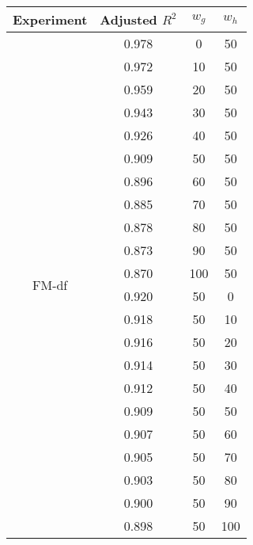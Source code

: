 \documentclass{article}
\begin{document}
\begin{table}[h]
  \centering
  \begin{tabular}{c c c c}
    \toprule
    Experiment                & Adjusted $R^2$ & $w_g$ & $w_h$ \\
    \midrule
    \multirow{22}{*}{FM-df} & 0.978 & 0 & 50 \\
                              & 0.972 & 10  & 50 \\
                              & 0.959 & 20  & 50 \\
                              & 0.943 & 30  & 50 \\
                              & 0.926 & 40  & 50 \\
                              & 0.909 & 50  & 50 \\
                              & 0.896 & 60  & 50 \\
                              & 0.885 & 70  & 50 \\
                              & 0.878 & 80  & 50 \\
                              & 0.873 & 90  & 50 \\
                              & 0.870 & 100 & 50 \\
                              & 0.920 & 50  & 0 \\
                              & 0.918 & 50  & 10 \\
                              & 0.916 & 50  & 20 \\
                              & 0.914 & 50  & 30 \\
                              & 0.912 & 50  & 40 \\
                              & 0.909 & 50  & 50 \\
                              & 0.907 & 50  & 60 \\
                              & 0.905 & 50  & 70 \\
                              & 0.903 & 50  & 80 \\
                              & 0.900 & 50  & 90 \\
                              & 0.898 & 50  & 100 \\
    \bottomrule
  \end{tabular}
\end{table}
\end{document}
